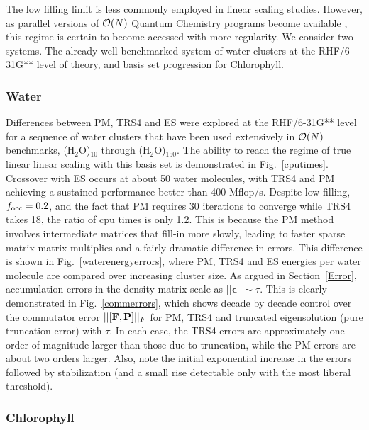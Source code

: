 \commentoutA{\documentclass[prl,aps,twocolumn,showpacs,twocolumngrid,superbib]{revtex4}}
\begin{document}
The low filling limit is less commonly employed in linear scaling studies.  However, as parallel versions
of ${\cal O}(N)$ Quantum Chemistry programs become available \cite{MChallacombe00B,CGan03}, this regime 
is certain to become accessed with more regularity.  We consider two systems.  The already well benchmarked 
system of water clusters at the RHF/6-31G** level of theory, and basis set progression for Chlorophyll.

\subsubsection{Water}

Differences between PM, TRS4 and ES were explored at the RHF/6-31G** level for a sequence 
of water clusters that have been used extensively in ${\cal O}(N)$ benchmarks\cite{MChallacombe96,MChallacombe96A,MChallacombe97,JBurant96,ESchwegler97,JMillam97,ADaniels97,COchsenfeld98,ESchwegler99}, (H$_2$O)$_{10}$ through (H$_2$O)$_{150}$.
The ability to reach the regime 
of true linear linear scaling with this basis set is demonstrated in Fig.~\ref{cputimes}.
Crossover with ES occurs at about 50 water molecules, with {\sc TRS4} and {\sc PM} achieving a sustained 
performance better than 400 Mflop/s.  Despite low filling, $f_{\rm occ}=0.2$, and the fact that PM 
requires 30 iterations to converge while TRS4 takes 18, the ratio of cpu times is only 1.2.  
This is because the PM method involves intermediate matrices that fill-in more slowly, leading to 
faster sparse matrix-matrix multiplies and a fairly dramatic difference in errors.  
This difference is shown in Fig.~\ref{waterenergyerrors}, where PM, TRS4 and ES energies per water molecule 
are compared over increasing cluster size.  As argued in Section~\ref{Error}, accumulation errors 
in the density matrix scale as $||{\bm\epsilon}||\sim \tau$. This is clearly demonstrated in 
Fig.~\ref{commerrors}, which shows decade by decade control over the commutator error 
$||[{\bf F,P}]||_F$ for PM, TRS4 and truncated eigensolution (pure truncation error) with $\tau$. 
In each case, the TRS4 errors are approximately one order of magnitude larger than those due to 
truncation, while the PM errors are about two orders larger.  Also, note the initial exponential  
increase in the errors followed by stabilization (and a small rise detectable only with the 
most liberal threshold).

\subsubsection{Chlorophyll}
 
\end{document}

